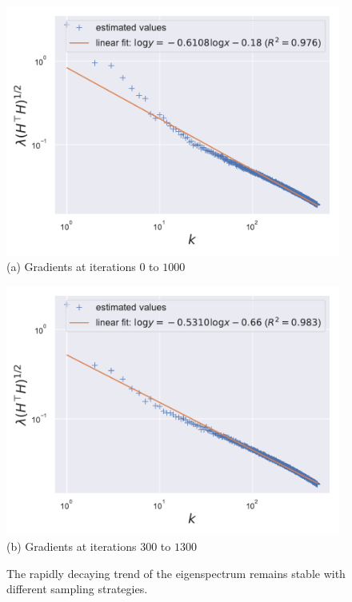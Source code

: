 \begin{figure}[thb]
\begin{center}
\begin{minipage}[t]{0.45\linewidth}
\centering
{\includegraphics[width=0.98\textwidth]{figs/privlm/roberta/less_samples_no_trim_front/eigenvalue-linfit.pdf}}
(a) Gradients at iterations $0$ to $1000$
\end{minipage}
\begin{minipage}[t]{0.45\linewidth}
\centering
{\includegraphics[width=0.98\textwidth]{figs/privlm/roberta/less_samples_trim_front/eigenvalue-linfit.pdf}}
(b) Gradients at iterations $300$ to $1300$
\end{minipage}
\end{center}
\caption{
The rapidly decaying trend of the eigenspectrum remains stable with different sampling strategies.
}
\label{fig:trunc_strategy_robust}
\end{figure}

